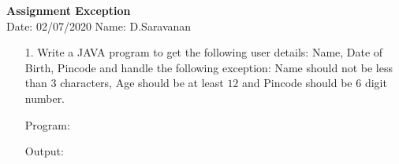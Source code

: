 \documentclass[a4paper,11pt,openright]{report}
\begin{document}
\singlespacing
\pagestyle{plain}

\begin{center}
\textbf{Assignment Exception} \\
Date: 02/07/2020 \hspace{2mm} Name: D.Saravanan
\end{center}

\vspace{10px}

\begin{enumerate}

\item[1.] Write a JAVA program to get the following user details: Name, Date of Birth,
Pincode and handle the following exception: Name should not be less than $3$ characters,
Age should be at least $12$ and Pincode should be $6$ digit number.

\vspace{0.5cm}

Program: 


\vspace{0.5cm}

Output:


\end{enumerate}
\end{document}
